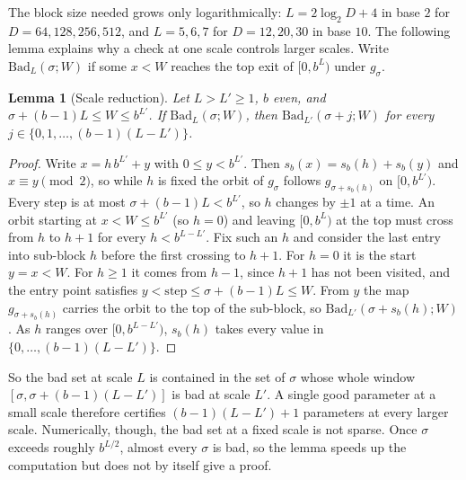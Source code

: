 \documentclass[11pt]{article}
\newtheorem{lemma}[theorem]{Lemma}
\theoremstyle{definition}
\theoremstyle{remark}
\begin{document}
The block size needed grows only logarithmically: $L=2\log_2D+4$ in base $2$
for $D=64,128,256,512$, and $L=5,6,7$ for $D=12,20,30$ in base $10$. The
following lemma explains why a check at one scale controls larger scales.
Write $\mathrm{Bad}_L(\sigma;W)$ if some $x<W$ reaches the top exit of
$[0,b^L)$ under $g_\sigma$.

\begin{lemma}[Scale reduction]\label{lem:scale}
Let $L>L'\ge1$, $b$ even, and $\sigma+(b-1)L\le W\le b^{L'}$. If
$\mathrm{Bad}_L(\sigma;W)$, then $\mathrm{Bad}_{L'}(\sigma+j;W)$ for every
$j\in\{0,1,\dots,(b-1)(L-L')\}$.
\end{lemma}

\begin{proof}
Write $x=h\,b^{L'}+y$ with $0\le y<b^{L'}$. Then
$s_b(x)=s_b(h)+s_b(y)$ and $x\equiv y\pmod 2$, so while $h$ is fixed the orbit
of $g_\sigma$ follows $g_{\sigma+s_b(h)}$ on $[0,b^{L'})$. Every step is at
most $\sigma+(b-1)L<b^{L'}$, so $h$ changes by $\pm1$ at a time. An orbit
starting at $x<W\le b^{L'}$ (so $h=0$) and leaving $[0,b^L)$ at the top must
cross from $h$ to $h+1$ for every $h<b^{L-L'}$. Fix such an $h$ and consider
the last entry into sub-block $h$ before the first crossing to $h+1$. For
$h=0$ it is the start $y=x<W$. For $h\ge1$ it comes from $h-1$, since $h+1$
has not been visited, and the entry point satisfies
$y<\text{step}\le\sigma+(b-1)L\le W$. From $y$ the map
$g_{\sigma+s_b(h)}$ carries the orbit to the top of the sub-block, so
$\mathrm{Bad}_{L'}(\sigma+s_b(h);W)$. As $h$ ranges over
$[0,b^{L-L'})$, $s_b(h)$ takes every value in $\{0,\dots,(b-1)(L-L')\}$.
\end{proof}

So the bad set at scale $L$ is contained in the set of $\sigma$ whose whole
window $[\sigma,\sigma+(b-1)(L-L')]$ is bad at scale $L'$. A single good
parameter at a small scale therefore certifies $(b-1)(L-L')+1$ parameters at
every larger scale. Numerically, though, the bad set at a fixed scale is not
sparse. Once $\sigma$ exceeds roughly $b^{L/2}$, almost every $\sigma$ is bad,
so the lemma speeds up the computation but does not by itself give a proof.
\end{document}
